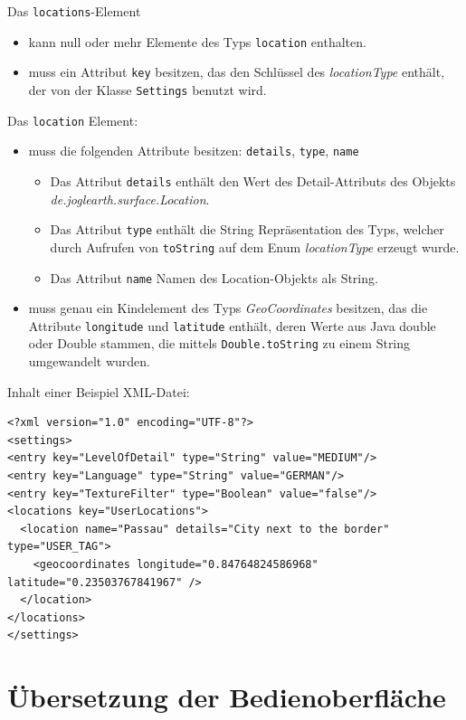 \documentclass[10pt]{scrreprt}
\begin{document}
 Das \texttt{locations}-Element
\begin{itemize}
 \item kann null oder mehr Elemente des Typs \texttt{location} enthalten.
 \item muss ein Attribut \texttt{key} besitzen, das den Schlüssel des \textit{locationType} enthält, der von der Klasse \texttt{Settings} benutzt wird.
\end{itemize}

 Das \texttt{location} Element:
\begin{itemize}
 \item muss die folgenden Attribute besitzen: \texttt{details}, \texttt{type}, \texttt{name}
 \begin{itemize}
  \item Das Attribut \texttt{details} enthält den Wert des Detail-Attributs des Objekts \textit{de.joglearth.surface.Location}.
  \item Das Attribut \texttt{type} enthält die String Repräsentation des Typs, welcher durch Aufrufen von \texttt{toString} auf dem Enum \textit{locationType} erzeugt wurde.
  \item Das Attribut \texttt{name} Namen des Location-Objekts als String.
  \end{itemize}
 \item muss genau ein Kindelement des Typs \textit{GeoCoordinates} besitzen, das die Attribute \texttt{longitude} und \texttt{latitude} enthält, deren Werte aus Java double oder Double stammen, die mittels \texttt{Double.toString} zu einem String umgewandelt wurden.
\end{itemize}

Inhalt einer Beispiel XML-Datei:
\lstset{language=XML}
\begin{lstlisting}[frame=single]
<?xml version="1.0" encoding="UTF-8"?>
<settings>
<entry key="LevelOfDetail" type="String" value="MEDIUM"/>
<entry key="Language" type="String" value="GERMAN"/>
<entry key="TextureFilter" type="Boolean" value="false"/>
<locations key="UserLocations">
  <location name="Passau" details="City next to the border" type="USER_TAG">
    <geocoordinates longitude="0.84764824586968" latitude="0.23503767841967" />
  </location>
</locations>
</settings>
\end{lstlisting}


\chapter{Übersetzung der Bedienoberfläche}
\end{document}
